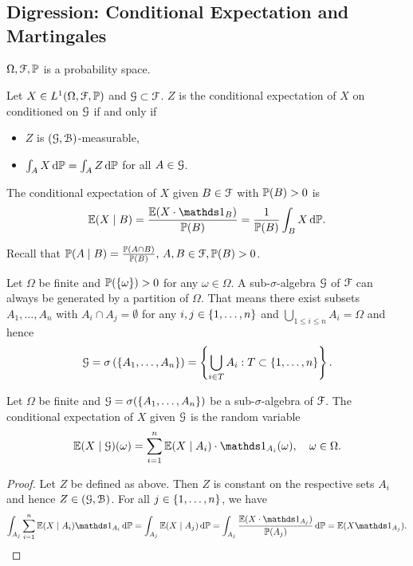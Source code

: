 \documentclass[12pt]{amsart}
\begin{document}
\subsection{Digression: Conditional Expectation and Martingales}
\(\Omega, \cF, \P\) is a probability space.
\begin{definition}
    Let \(X \in L^1(\Omega, \cF, \P)\) and \(\cG \subset \cF\). \(Z\) is the conditional expectation of \(X\) on conditioned on \(\cG\) if and only if \begin{itemize}
        \item \(Z\) is \((\cG, \cB)\)-measurable,
        \item \(\intt[A][][X][\P] = \intt[A][][Z][\P]\) for all \(A \in \cG\).
    \end{itemize}
    The conditional expectation of \(X\) given \(B \in \cF\) with \(\P(B) > 0\) is \[
        \E(X \mid B) = \frac{\E(X \cdot \indic_B)}{\P(B)} = \frac{1}{\P(B)} \intt[B][][X][\P].
    \]
\end{definition}

\begin{remark}
    Recall that \(\P(A \mid B) = \frac{\P(A \cap B)}{\P(B)},\, A, B \in \cF, \P(B) > 0\).
\end{remark}
Let \(\Omega\) be finite and \(\P(\set{\omega}) > 0\) for any \(\omega \in \Omega\). A sub-\(\sigma\)-algebra \(\cG\) of \(\cF\) can always be generated by a partition of \(\Omega\). That means there exist subsets \(A_1, \dots, A_n\) with \(A_i \cap A_j = \emptyset\) for any \(i, j \in \set{1, \dots, n}\) and \(\bigcup_{1 \leq i \leq n} A_i = \Omega\) and hence \[
    \cG = \sigma\left(\set{A_1, \dots, A_n}\right) = \set{\bigcup_{i \in T} A_i: T \subset \set{1, \dots, n}}.
\]
\begin{theorem}
    Let \(\Omega\) be finite and \(\cG = \sigma(\set{A_1, \dots, A_n})\) be a sub-\(\sigma\)-algebra of \(\cF\). The conditional expectation of \(X\) given \(\cG\) is the random variable \[
        \E(X \mid \cG)(\omega) = \sum_{i=1}^n \E(X \mid A_i) \cdot \indic_{A_i}(\omega), \quad \omega \in \Omega.
    \]
\end{theorem}
\begin{proof}
    Let \(Z\) be defined as above. Then \(Z\) is constant on the respective sets \(A_i\) and hence \(Z \in (\cG, \cB)\). For all \(j \in \set{1, \dots, n}\), we have
    \begin{align*}
        \intt[A_j][][\sum_{i=1}^n \E (X \mid A_i) \indic_{A_i}][\P]
        = \intt[A_j][][\E(X \mid A_j)][\P]
        = \intt[A_j][][\frac{\E(X \cdot \indic_{A_j})}{\P(A_j)}][\P] = \E(X \indic_{A_j}).
    \end{align*}
\end{proof}
\end{document}
